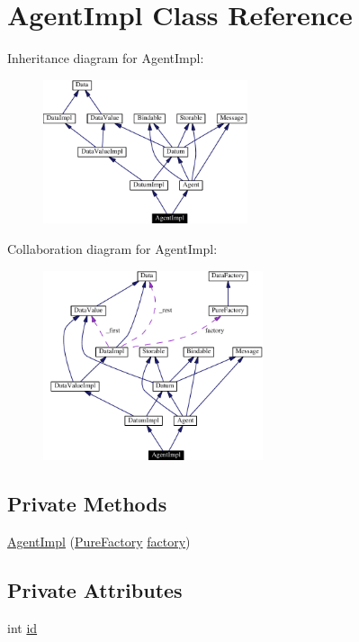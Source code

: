 \hypertarget{classAgentImpl}{
\section{Agent\-Impl  Class Reference}
\label{classAgentImpl}
}
Inheritance diagram for Agent\-Impl:\begin{figure}[H]
\begin{center}
\leavevmode
\includegraphics[width=170pt]{classAgentImpl__inherit__graph}
\end{center}
\end{figure}
Collaboration diagram for Agent\-Impl:\begin{figure}[H]
\begin{center}
\leavevmode
\includegraphics[width=183pt]{classAgentImpl__coll__graph}
\end{center}
\end{figure}
\subsection*{Private Methods}
\begin{CompactItemize}
\item 
\hyperlink{classAgentImpl_c0}{Agent\-Impl} (\hyperlink{classPureFactory}{Pure\-Factory} \hyperlink{classDataImpl_o0}{factory})
\end{CompactItemize}
\subsection*{Private Attributes}
\begin{CompactItemize}
\item 
int \hyperlink{classAgentImpl_o0}{id}
\end{CompactItemize}
